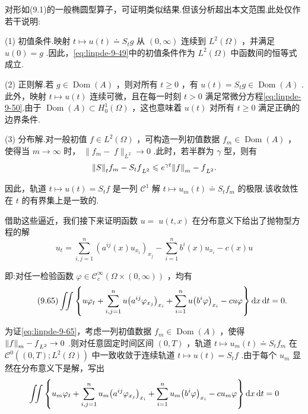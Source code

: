 对形如(9.1)的一般椭圆型算子，可证明类似结果.但该分析超出本文范围.此处仅作若干说明:

(1) 初值条件.映射 $t \mapsto  u\left( t\right)  \doteq  {S}_{t}g$ 从 $(0,\infty)$ 连续到 ${L}^{2}\left( \Omega \right)$ ，并满足 $u\left( 0\right)  = g$ .因此，\eqref{eq:linpde-9-49}中的初值条件作为 ${L}^{2}\left( \Omega \right)$ 中函数间的恒等式成立.

(2) 正则解.若 $g \in  \operatorname{Dom}\left( A\right)$ ，则对所有 $t \geq  0$ ，有 $u\left( t\right)  = {S}_{t}g \in  \operatorname{Dom}\left( A\right)$ .此外，映射 $t \mapsto  u\left( t\right)$ 连续可微，且在每一时刻 $t > 0$ 满足常微分方程\eqref{eq:linpde-9-50}.由于 $\operatorname{Dom}\left( A\right)  \subset  {H}_{0}^{1}\left( \Omega \right)$ ，这也意味着 $u\left( t\right)$ 对所有 $t \geq  0$ 满足正确的边界条件.

(3) 分布解.对一般初值 $f \in  {L}^{2}\left( \Omega \right)$ ，可构造一列初值数据 ${f}_{m} \in  \operatorname{Dom}\left( A\right)$ ，使得当 $m \rightarrow  \infty$ 时， $\| {f}_{m} - \; f{\| }_{{L}^{2}} \rightarrow  0$ .此时，若半群为 $\gamma$ 型，则有
\[
{\norm{S}_{t}{f}_{m} - {S}_{t}f}_{{L}^{2}} \leqslant  {e}^{\gamma t}{\norm{f}_{m} - f}_{{L}^{2}}.
\]

因此，轨道 $t \mapsto  u\left( t\right)  = {S}_{t}f$ 是一列 ${\mathcal{C}}^{1}$ 解 $t \mapsto  {u}_{m}\left( t\right)  \doteq  {S}_{t}{f}_{m}$ 的极限.该收敛性在 $t$ 的有界集上是一致的.

借助这些逼近，我们接下来证明函数 $u = \; u\left( {t,x}\right)$ 在分布意义下给出了抛物型方程的解
\begin{equation}\tag{9.64}\label{eq:linpde-9-64}
{u}_{t} = \sum_{{i,j = 1}}^{n}{\left( {a}^{ij}\left( x\right) {u}_{{x}_{i}}\right) }_{{x}_{j}} - \sum_{{i = 1}}^{n}{b}^{i}\left( x\right) {u}_{{x}_{i}} - c\left( x\right) u
\end{equation}

即:对任一检验函数 $\varphi  \in  {\mathcal{C}}_{c}^{\infty }\left( {\Omega  \times  ( 0,\infty ) }\right)$ ，均有
\begin{equation}\tag{9.65}\label{eq:linpde-9-65}
\iint \left\{  {u{\varphi }_{t} + \sum_{{i,j = 1}}^{n}u{\left( {a}^{ij}{\varphi }_{{x}_{j}}\right) }_{{x}_{i}} + \sum_{{i = 1}}^{n}u{\left( {b}^{i}\varphi \right) }_{{x}_{i}} - {cu\varphi }}\right\}  {\mathop{}\!\mathrm{d} x\mathop{}\!\mathrm{d} t} = 0.
\end{equation}

为证\eqref{eq:linpde-9-65}，考虑一列初值数据 ${f}_{m} \in  \operatorname{Dom}\left( A\right)$ ，使得 ${\norm{f}_{m} - f}_{{L}^{2}} \rightarrow  0$ .则对任意固定时间区间 $\left(  {0,T}\right)$ ，轨道 $t \mapsto  {u}_{m}\left( t\right)  \doteq  {S}_{t}{f}_{m}$ 在 ${\mathcal{C}}^{0}\left( {\left(  {0,T}\right)  ;{L}^{2}\left( \Omega \right) }\right)$ 中一致收敛于连续轨道 $t \mapsto  u\left( t\right)  = {S}_{t}f$ .由于每个 ${u}_{m}$ 显然在分布意义下是解，写出
\[
\iint \left\{  {{u}_{m}{\varphi }_{t} + \sum_{{i,j = 1}}^{n}{u}_{m}{\left( {a}^{ij}{\varphi }_{{x}_{j}}\right) }_{{x}_{i}} + \sum_{{i = 1}}^{n}{u}_{m}{\left( {b}^{i}\varphi \right) }_{{x}_{i}} - c{u}_{m}\varphi }\right\}  {\mathop{}\!\mathrm{d} x\mathop{}\!\mathrm{d} t} = 0
\]

